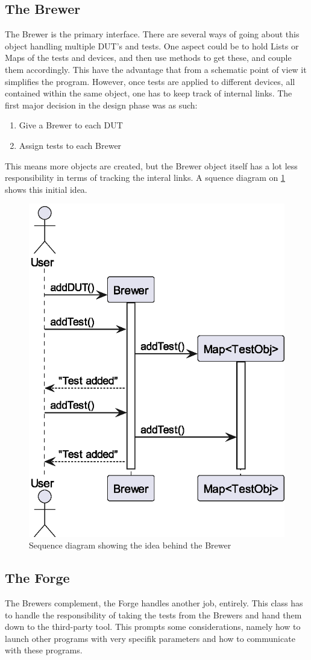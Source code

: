 \subsection{The Brewer}
The Brewer is the primary interface. There are several ways of going about this object handling multiple DUT's and tests. One aspect could be to hold Lists or Maps of the tests and devices, and then use methods to get these, and couple them accordingly. This have the advantage that from a schematic point of view it simplifies the program. However, once tests are applied to different devices, all contained within the same object, one has to keep track of internal links. The first major decision in the design phase was as such:
\begin{enumerate}
    \item Give a Brewer to each DUT
    \item Assign tests to each Brewer
\end{enumerate}
This means more objects are created, but the Brewer object itself has a lot less responsibility in terms of tracking the interal links.\newline
A squence diagram on \cref{fig:seqBrew} shows this initial idea.
\begin{figure}
    \centering
    \caption{Sequence diagram showing the idea behind the Brewer}\label{fig:seqBrew}
    \includegraphics[width=.3\textwidth]{out/plantuml/Brewer/brewer.eps}
\end{figure}
\subsection{The Forge}
The Brewers complement, the Forge handles another job, entirely. This class has to handle the responsibility of taking the tests from the Brewers and hand them down to the third-party tool. This prompts some considerations, namely how to launch other programs with very specifik parameters and how to communicate with these programs.
